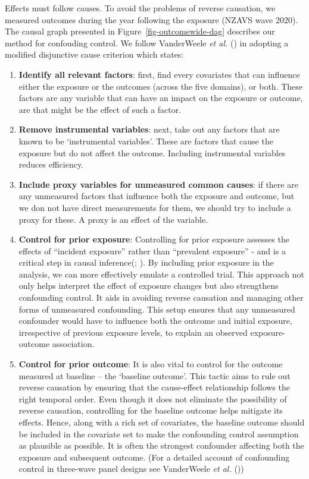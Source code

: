 \documentclass[
  singlecolumn,
  9pt]{scrartcl}
\begin{document}
Effects must follow causes. To avoid the problems of reverse causation,
we measured outcomes during the year following the exposure (NZAVS wave
2020). The causal graph presented in Figure~\ref{fig-outcomewide-dag}
describes our method for confouding control. We follow VanderWeele
\emph{et al.} () in adopting a
modified disjunctive cause criterion which states:

\begin{enumerate}
\def\labelenumi{\arabic{enumi}.}
\item
  \textbf{Identify all relevant factors}: first, find every covariates
  that can influence either the exposure or the outcomes (across the
  five domains), or both. These factors are any variable that can have
  an impact on the exposure or outcome, are that might be the effect of
  such a factor.
\item
  \textbf{Remove instrumental variables}: next, take out any factors
  that are known to be `instrumental variables'. These are factors that
  cause the exposure but do not affect the outcome. Including
  instrumental variables reduces efficiency.
\item
  \textbf{Include proxy variables for unmeasured common causes}: if
  there are any unmeasured factors that influence both the exposure and
  outcome, but we don not have direct measurements for them, we should
  try to include a proxy for these. A proxy is an effect of the
  variable.
\item
  \textbf{Control for prior exposure}: Controlling for prior exposure
  assesses the effects of ``incident exposure'' rather than ``prevalent
  exposure'' - and is a critical step in causal
  inference(;
  ). By including prior
  exposure in the analysis, we can more effectively emulate a controlled
  trial. This approach not only helps interpret the effect of exposure
  changes but also strengthens confounding control. It aids in avoiding
  reverse causation and managing other forms of unmeasured confounding.
  This setup ensures that any unmeasured confounder would have to
  influence both the outcome and initial exposure, irrespective of
  previous exposure levels, to explain an observed exposure-outcome
  association.
\item
  \textbf{Control for prior outcome}: It is also vital to control for
  the outcome measured at baseline -- the `baseline outcome'. This
  tactic aims to rule out reverse causation by ensuring that the
  cause-effect relationship follows the right temporal order. Even
  though it does not eliminate the possibility of reverse causation,
  controlling for the baseline outcome helps mitigate its effects.
  Hence, along with a rich set of covariates, the baseline outcome
  should be included in the covariate set to make the confounding
  control assumption as plausible as possible. It is often the strongest
  confounder affecting both the exposure and subsequent outcome. (For a
  detailed account of confounding control in three-wave panel designs
  see VanderWeele \emph{et al.} ())
\end{enumerate}
\end{document}
